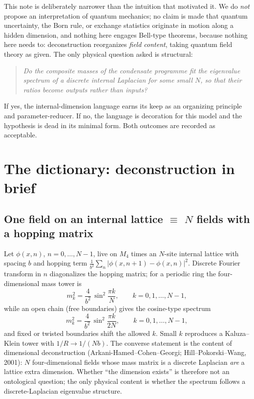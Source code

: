 \documentclass[11pt,a4paper]{article}
\begin{document}
This note is deliberately narrower than the intuition that
motivated it.
We do \emph{not} propose an interpretation of quantum mechanics;
no claim is made that quantum uncertainty, the Born rule, or
exchange statistics originate in motion along a hidden dimension,
and nothing here engages Bell-type theorems, because nothing here
needs to: deconstruction reorganizes \emph{field content}, taking
quantum field theory as given.
The only physical question asked is structural:

\begin{quote}
\emph{Do the composite masses of the condensate programme fit the
eigenvalue spectrum of a discrete internal Laplacian for some
small $N$, so that their ratios become outputs rather than
inputs?}
\end{quote}

If yes, the internal-dimension language earns its keep as an
organizing principle and parameter-reducer.
If no, the language is decoration for this model and the
hypothesis is dead in its minimal form.
Both outcomes are recorded as acceptable.

\section{The dictionary: deconstruction in brief}
\label{sec:dict}

\subsection{One field on an internal lattice $\equiv$ $N$ fields
with a hopping matrix}

Let $\phi(x,n)$, $n = 0,\dots,N-1$, live on $M_4$ times an
$N$-site internal lattice with spacing $b$ and hopping term
$\frac{1}{b^2}\sum_n |\phi(x,n{+}1)-\phi(x,n)|^2$.
Discrete Fourier transform in $n$ diagonalizes the hopping matrix;
for a periodic ring the four-dimensional mass tower is
\begin{equation}
m_k^2 = \frac{4}{b^2}\,\sin^2\!\frac{\pi k}{N},
\qquad k = 0,1,\dots,N-1,
\label{eq:ring}
\end{equation}
while an open chain (free boundaries) gives the cosine-type
spectrum
\begin{equation}
m_k^2 = \frac{4}{b^2}\,\sin^2\!\frac{\pi k}{2N},
\qquad k = 0,1,\dots,N-1,
\label{eq:chain}
\end{equation}
and fixed or twisted boundaries shift the allowed $k$.
Small $k$ reproduces a Kaluza--Klein tower with
$1/R \to 1/(Nb)$.
The converse statement is the content of dimensional
deconstruction (Arkani-Hamed--Cohen--Georgi; Hill--Pokorski--Wang,
2001): $N$ four-dimensional fields whose mass matrix is a discrete
Laplacian \emph{are} a lattice extra dimension.
Whether ``the dimension exists'' is therefore not an ontological
question; the only physical content is whether the spectrum
follows a discrete-Laplacian eigenvalue structure.
\end{document}
